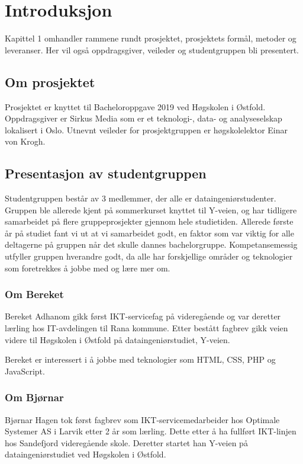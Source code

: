 \cleardoublepage
\chapter{Introduksjon}
\label{chap:intro}
Kapittel 1 omhandler rammene rundt prosjektet, prosjektets formål, metoder og leveranser. Her vil også oppdragsgiver, veileder og studentgruppen bli presentert. 

\section{Om prosjektet}
Prosjektet er knyttet til Bacheloroppgave 2019 ved Høgskolen i Østfold. Oppdragsgiver er Sirkus Media som er et teknologi-, data- og analyseselskap lokalisert i Oslo. Utnevnt veileder for prosjektgruppen er høgskolelektor Einar von Krogh.

\section{Presentasjon av studentgruppen}

Studentgruppen består av 3 medlemmer, der alle er dataingeniørstudenter. Gruppen ble allerede kjent på sommerkurset knyttet til Y-veien, og har tidligere samarbeidet på flere gruppeprosjekter gjennom hele studietiden. Allerede første år på studiet fant vi ut at vi samarbeidet godt, en faktor som var viktig for alle deltagerne på gruppen når det skulle dannes bachelorgruppe. Kompetansemessig utfyller gruppen hverandre godt, da alle har forskjellige områder og teknologier som foretrekkes å jobbe med og lære mer om.  

\subsection{Om Bereket}
Bereket Adhanom gikk først IKT-servicefag på videregående og var deretter lærling hos IT-avdelingen til Rana kommune. Etter bestått fagbrev gikk veien videre til Høgskolen i Østfold på dataingeniørstudiet, Y-veien.

Bereket er interessert i å jobbe med teknologier som HTML, CSS, PHP og JavaScript.

\subsection{Om Bjørnar}
Bjørnar Hagen tok først fagbrev som IKT-servicemedarbeider hos Optimale Systemer AS i Larvik etter 2 år som lærling. Dette etter å ha fullført IKT-linjen hos Sandefjord videregående skole. Deretter startet han Y-veien på dataingeniørstudiet ved Høgskolen i Østfold.

